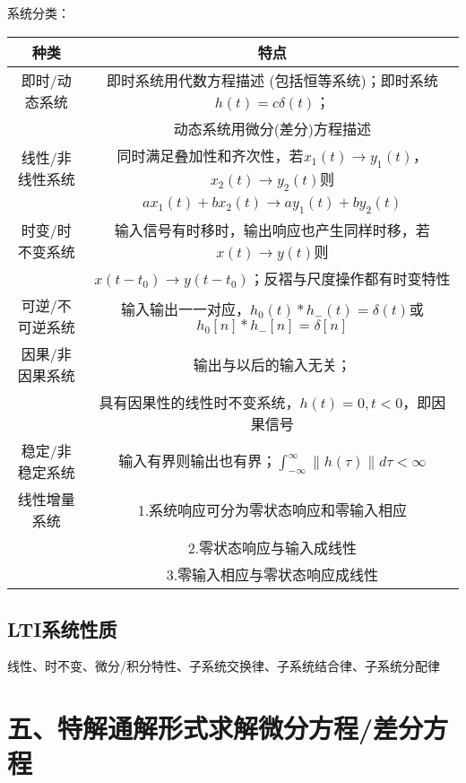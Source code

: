 系统分类：

\begin{tabular}{c|c}
种类 & 特点 \\
\hline
即时/动态系统 & 即时系统用代数方程描述 (包括恒等系统)；即时系统$h(t)=c\delta(t)$；\\
 & 动态系统用微分(差分)方程描述 \\
\hline
线性/非线性系统 & 同时满足叠加性和齐次性，若$x_1(t)\rightarrow y_1(t)$，$x_2(t)\rightarrow y_2(t)$则 \\
 & $ax_1(t)+bx_2(t)\rightarrow ay_1(t)+by_2(t)$ \\
\hline
时变/时不变系统 & 输入信号有时移时，输出响应也产生同样时移，若$x(t)\rightarrow y(t)$则 \\
 & $x(t-t_0)\rightarrow y(t-t_0)$；反褶与尺度操作都有时变特性 \\
\hline
可逆/不可逆系统 & 输入输出一一对应，$h_0(t)*h_-(t)=\delta(t) $或 $h_0[n]*h_-[n]=\delta[n]$ \\
\hline
因果/非因果系统 & 输出与以后的输入无关；\\
 & 具有因果性的线性时不变系统，$h(t)=0, t<0$，即因果信号 \\
\hline
稳定/非稳定系统 & 输入有界则输出也有界；$\int^\infty_{-\infty}\|h(\tau)\|d\tau<\infty$ \\
\hline
线性增量系统 & 1.系统响应可分为零状态响应和零输入相应 \\
 & 2.零状态响应与输入成线性 \\
 & 3.零输入相应与零状态响应成线性 \\
\end{tabular}

\subsection*{LTI系统性质}

线性、时不变、微分/积分特性、子系统交换律、子系统结合律、子系统分配律

\section*{五、特解通解形式求解微分方程/差分方程}

